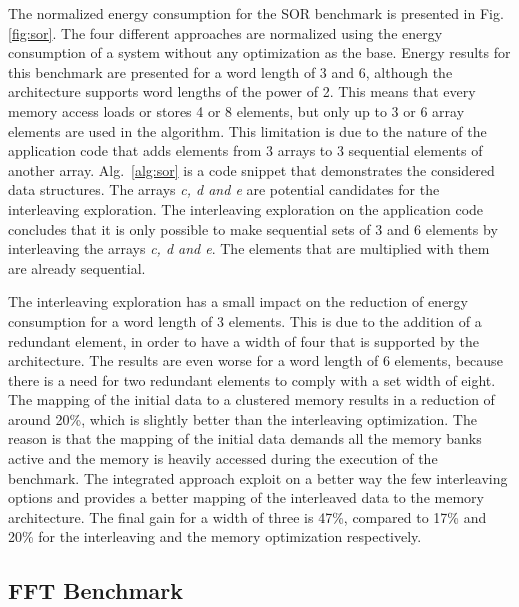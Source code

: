 \documentclass[prodmode,acmtecs]{acmsmall}
\begin{document}
The normalized energy consumption for the SOR benchmark is presented in Fig.\ref{fig:sor}.
The four different approaches are normalized using the energy consumption of a system without any optimization as the base.
Energy results for this benchmark are presented for a word length of 3 and 6, although the architecture supports word lengths of the power of 2.
This means that every memory access loads or stores 4 or 8 elements, but only up to 3 or 6 array elements are used in the algorithm.
This limitation is due to the nature of the application code that adds elements from 3 arrays to 3 sequential elements of another array. 
Alg.~\ref{alg:sor} is a code snippet that demonstrates the considered data structures.
The arrays \textit{c, d and e} are potential candidates for the interleaving exploration.
The interleaving exploration on the application code concludes that it is only possible to make sequential sets of 3 and 6 elements by interleaving the arrays \textit{c, d and e}.
The elements that are multiplied with them are already sequential.

 The interleaving exploration has a small impact on the reduction of energy consumption for a word length of 3 elements.
 This is due to the addition of a redundant element, in order to have a width of four that is supported by the architecture.
The results are even worse for a word length of 6 elements, because there is a need for two redundant elements to comply with a set width of eight.
The mapping of the initial data to a clustered memory results in a reduction of around 20\%, which is slightly better than the interleaving optimization.
The reason is that the mapping of the initial data demands all the memory banks active and the memory is heavily accessed during the execution of the benchmark.
The integrated approach exploit on a better way the few interleaving options and provides a better mapping of the interleaved data to the memory architecture.
The final gain for a width of three is 47\%, compared to 17\% and 20\% for the interleaving and the memory optimization respectively.

\subsection{FFT Benchmark}
\end{document}

